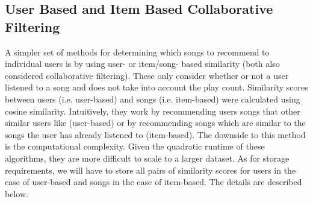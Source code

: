 \documentclass[12pt,preprint]{aastex}
\begin{document}
%


\subsection{User Based and Item Based Collaborative Filtering}
A simpler set of methods for determining which songs to recommend to individual users is by using user- or item/song- based similarity (both also considered collaborative filtering). These only consider whether or not a user listened to a song and does not take into account the play count. Similarity scores between users (i.e. user-based) and songs (i.e. item-based) were calculated using cosine similarity. Intuitively, they work by recommending users songs that other similar users like (user-based) or by recommending songs which are similar to the songs the user has already listened to (item-based). The downside to this method is the computational complexity. Given the quadratic runtime of these algorithms, they are more difficult to scale to a larger dataset. As for storage requirements, we will have to store all pairs of similarity scores for users in the case of user-based and songs in the case of item-based. The details are described below.
\end{document}
